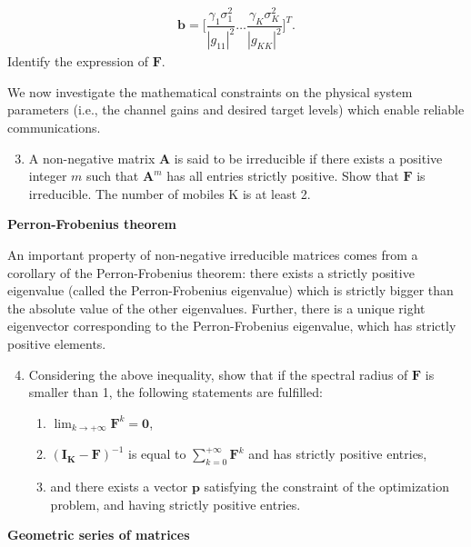 \documentclass [a4paper, 11pt] {article}
\begin{document}
\begin{exercise}{2}
\begin{enumerate}
\begin{align}
    \mathbf{b} =  \Bigg[\dfrac{\gamma_1\sigma_1^2}{|g_{11}|^2} \hdots \dfrac{\gamma_K\sigma_K^2}{|g_{KK}|^2}\Bigg]^T.
\end{align}
Identify the expression of $\mathbf{F}$.
\end{enumerate}


We now investigate the mathematical constraints on the physical system parameters (i.e., the channel gains and desired target levels) which enable reliable communications.

\begin{enumerate}
\setcounter{enumi}{2}
\item  A non-negative matrix $\mathbf{A}$ is said to be irreducible if there exists a positive integer $m$ such that $\mathbf{A}^m$ has all entries strictly positive. Show that $\mathbf{F}$ is irreducible. The number of mobiles K is at least 2.
\end{enumerate}


\textbf{Perron-Frobenius theorem}


An important property of non-negative irreducible matrices comes from a corollary of the Perron-Frobenius theorem: there exists a strictly positive eigenvalue (called the Perron-Frobenius eigenvalue) which is strictly bigger than the absolute value of the other eigenvalues. Further, there is a unique right eigenvector corresponding to the Perron-Frobenius eigenvalue, which has strictly positive elements.

\begin{enumerate}
\setcounter{enumi}{3}
\item Considering the above inequality, show that if the spectral radius of $\mathbf{F}$ is smaller than 1, the following statements are fulfilled:
\begin{enumerate}

    \item $\lim_{k\rightarrow + \infty} \mathbf{F}^k = \mathbf{0}$,
    \item $(\mathbf{I_K} - \mathbf{F})^{-1}$ is equal to $\sum_{k=0}^{+\infty} \mathbf{F}^k$ and has strictly positive entries,
    \item and there exists a vector $\mathbf{p}$ satisfying the constraint of the optimization problem, and having strictly positive entries.
\end{enumerate}
\end{enumerate}

\textbf{Geometric series of matrices}



\end{exercise}
\end{document}
